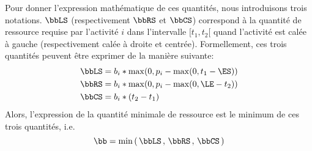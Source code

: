Pour donner l'expression mathématique de ces quantités, nous
introduisons trois notations. $\bbLS$ (respectivement $\bbRS$ et
$\bbCS$) correspond à la quantité de ressource requise par l'activité $i$
dans l'intervalle $[t_1,t_2[$  quand l'activité est calée à gauche
(respectivement calée à droite et centrée). Formellement, ces trois
quantités peuvent être exprimer de la manière suivante: 
\begin{align}
\bbLS&=b_i * \max(0,p_i- \max(0,t_1 - \ES)) \label{eq:LS_CUSP}\\
\bbRS&=b_i * \max(0,p_i- \max(0, \LE-t_2))\label{eq:RS_CUSP}\\
\bbCS&=b_i * (t_2-t_1)\label{eq:CS_CUSP}
\end{align}
Alors, l'expression de la quantité minimale de ressource est le
minimum de ces trois quantités, i.e.
\begin{equation}
\bb=\min\left(\, \bbLS\, ,\,\bbRS\, ,\,\bbCS \, \right)
\end{equation} 


